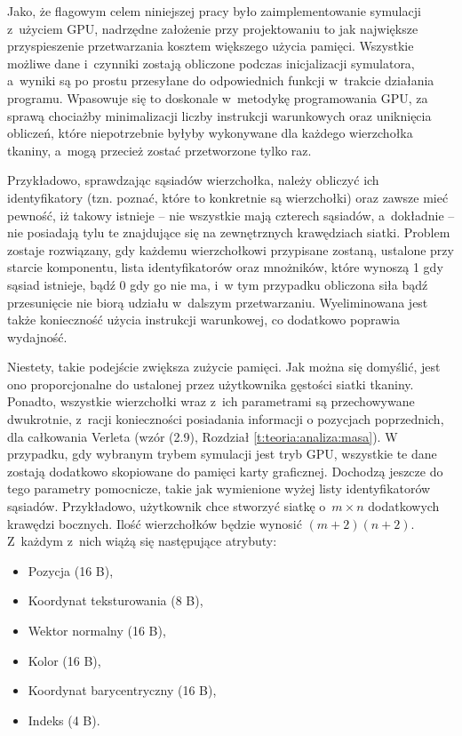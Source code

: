 	Jako, że flagowym celem niniejszej pracy było zaimplementowanie symulacji z~użyciem GPU, nadrzędne założenie przy projektowaniu to jak największe przyspieszenie przetwarzania kosztem większego użycia pamięci. Wszystkie możliwe dane i~czynniki zostają obliczone podczas inicjalizacji symulatora, a~wyniki są po prostu przesyłane do odpowiednich funkcji w~trakcie działania programu. Wpasowuje się to doskonale w~metodykę programowania GPU, za sprawą chociażby minimalizacji liczby instrukcji warunkowych oraz uniknięcia obliczeń, które niepotrzebnie byłyby wykonywane dla każdego wierzchołka tkaniny, a~mogą przecież zostać przetworzone tylko raz. 
	
	Przykładowo, sprawdzając sąsiadów wierzchołka, należy obliczyć ich identyfikatory (tzn. poznać, które to konkretnie są wierzchołki) oraz zawsze mieć pewność, iż takowy istnieje -- nie wszystkie mają czterech sąsiadów, a~dokładnie -- nie posiadają tylu te znajdujące się na zewnętrznych krawędziach siatki. Problem zostaje rozwiązany, gdy każdemu wierzchołkowi przypisane zostaną, ustalone przy starcie komponentu, lista identyfikatorów oraz mnożników, które wynoszą 1 gdy sąsiad istnieje, bądź 0 gdy go nie ma, i~w tym przypadku obliczona siła bądź przesunięcie nie biorą udziału w~dalszym przetwarzaniu. Wyeliminowana jest także konieczność użycia instrukcji warunkowej, co dodatkowo poprawia wydajność. 
	
	Niestety, takie podejście zwiększa zużycie pamięci. Jak można się domyślić, jest ono proporcjonalne do ustalonej przez użytkownika gęstości siatki tkaniny. Ponadto, wszystkie wierzchołki wraz z~ich parametrami są przechowywane dwukrotnie, z~racji konieczności posiadania informacji o pozycjach poprzednich, dla całkowania Verleta (wzór (2.9), Rozdział \ref{t:teoria:analiza:masa}). W przypadku, gdy wybranym trybem symulacji jest tryb GPU, wszystkie te dane zostają dodatkowo skopiowane do pamięci karty graficznej. Dochodzą jeszcze do tego parametry pomocnicze, takie jak wymienione wyżej listy identyfikatorów sąsiadów. Przykładowo, użytkownik chce stworzyć siatkę o~\(m \times n\) dodatkowych krawędzi bocznych. Ilość wierzchołków będzie wynosić \( (m + 2)(n + 2) \). Z~każdym z~nich wiążą się następujące atrybuty:
	
	\begin{itemize}
		\item Pozycja (16 B),
		\item Koordynat teksturowania (8 B),
		\item Wektor normalny (16 B),
		\item Kolor (16 B),
		\item Koordynat barycentryczny (16 B),
		\item Indeks (4 B).
	\end{itemize}
	

